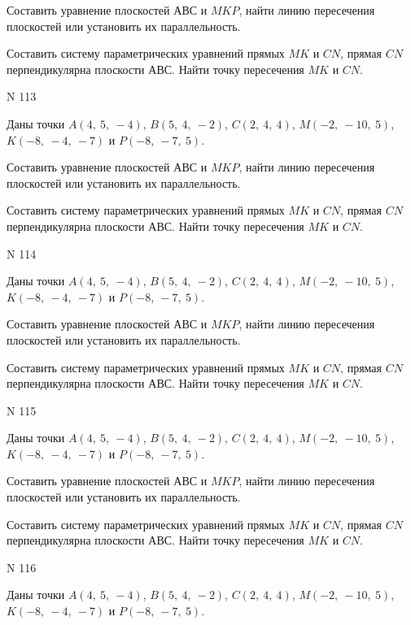\documentclass[11pt]{report}
\begin{document}
Составить уравнение плоскостей $АВС$ и $MKP$,
найти линию пересечения плоскостей или установить их параллельность.

Составить систему параметрических уравнений прямых $MK$ и $CN$,
прямая $CN$ перпендикулярна плоскости $АВС$. 
Найти точку пересечения $MK$ и $CN$.



 N 113

Даны точки $A\left( 4, \  5, \  -4\right)$, $B\left( 5, \  4, \  -2\right)$, $C\left( 2, \  4, \  4\right)$, $M\left( -2, \  -10, \  5\right)$, $K\left( -8, \  -4, \  -7\right)$ и $P\left( -8, \  -7, \  5\right)$.


Составить уравнение плоскостей $АВС$ и $MKP$,
найти линию пересечения плоскостей или установить их параллельность.

Составить систему параметрических уравнений прямых $MK$ и $CN$,
прямая $CN$ перпендикулярна плоскости $АВС$. 
Найти точку пересечения $MK$ и $CN$.



 N 114

Даны точки $A\left( 4, \  5, \  -4\right)$, $B\left( 5, \  4, \  -2\right)$, $C\left( 2, \  4, \  4\right)$, $M\left( -2, \  -10, \  5\right)$, $K\left( -8, \  -4, \  -7\right)$ и $P\left( -8, \  -7, \  5\right)$.


Составить уравнение плоскостей $АВС$ и $MKP$,
найти линию пересечения плоскостей или установить их параллельность.

Составить систему параметрических уравнений прямых $MK$ и $CN$,
прямая $CN$ перпендикулярна плоскости $АВС$. 
Найти точку пересечения $MK$ и $CN$.



 N 115

Даны точки $A\left( 4, \  5, \  -4\right)$, $B\left( 5, \  4, \  -2\right)$, $C\left( 2, \  4, \  4\right)$, $M\left( -2, \  -10, \  5\right)$, $K\left( -8, \  -4, \  -7\right)$ и $P\left( -8, \  -7, \  5\right)$.


Составить уравнение плоскостей $АВС$ и $MKP$,
найти линию пересечения плоскостей или установить их параллельность.

Составить систему параметрических уравнений прямых $MK$ и $CN$,
прямая $CN$ перпендикулярна плоскости $АВС$. 
Найти точку пересечения $MK$ и $CN$.



 N 116

Даны точки $A\left( 4, \  5, \  -4\right)$, $B\left( 5, \  4, \  -2\right)$, $C\left( 2, \  4, \  4\right)$, $M\left( -2, \  -10, \  5\right)$, $K\left( -8, \  -4, \  -7\right)$ и $P\left( -8, \  -7, \  5\right)$.
\end{document}
